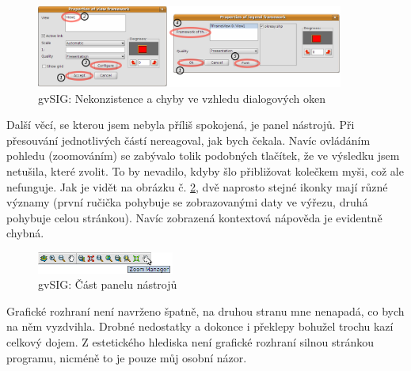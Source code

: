 \documentclass[a4paper,12pt,draft]{article}
\begin{document}
\begin{figure}[h!]
\centering
\includegraphics[width=0.9\textwidth]{./GUI_screenshots/gvSIG_dialogy.png}
\caption{gvSIG: Nekonzistence a chyby ve vzhledu dialogových oken}
\label{fig:gvSIG_dialogy}
\end{figure}

Další věcí, se kterou jsem nebyla příliš spokojená, je panel
nástrojů. Při přesouvání jednotlivých částí nereagoval, jak bych
čekala. Navíc ovládáním pohledu (zoomováním) se zabývalo tolik
podobných tlačítek, že ve výsledku jsem netušila, které zvolit. To by
nevadilo, kdyby šlo přibližovat kolečkem myši, což ale nefunguje. Jak je
vidět na obrázku č. \ref{fig:gvSIG_toolbar}, dvě naprosto stejné ikonky
mají různé významy (první ručička pohybuje se zobrazovanými daty ve
výřezu, druhá pohybuje celou stránkou). Navíc zobrazená kontextová
nápověda je evidentně chybná.

\begin{figure}[h!]
\centering
\includegraphics[width=0.4\textwidth]{./GUI_screenshots/gvSIG_toolbar.png}
\caption{gvSIG: Část panelu nástrojů}
\label{fig:gvSIG_toolbar}
\end{figure}

%

Grafické rozhraní není navrženo špatně, na druhou stranu mne nenapadá,
co bych na něm vyzdvihla. Drobné nedostatky a dokonce i překlepy bohužel
trochu kazí celkový dojem. Z estetického hlediska není grafické rozhraní
silnou stránkou programu, nicméně to je pouze můj osobní názor.
\end{document}
